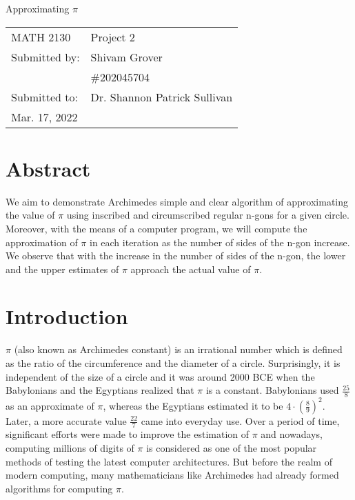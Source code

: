 \documentclass[12pt]{article}
\begin{document}
\begin{titlepage}
\begin{center}
\large Approximating $\displaystyle \pi$
\end{center}
\vspace{6cm}
\hfill\begin{tabular}{ll}
MATH 2130 & Project 2 \\
Submitted by: & Shivam Grover \\
& \#202045704 \\
Submitted to: & Dr. Shannon Patrick Sullivan \\
Mar. 17, 2022

\end{tabular}
\end{titlepage}

\section*{Abstract}
We aim to demonstrate Archimedes simple and clear algorithm of approximating the value of $\pi$ using inscribed and circumscribed regular n-gons for a given circle. Moreover, with the means of a computer program, we will compute the approximation of $\pi$ in each iteration as the number of sides of the n-gon increase.
We observe that with the increase in the number of sides of the n-gon, the lower and the upper estimates of $\pi$ approach the actual value of $\pi$.\\

\section {Introduction}
$\pi$ (also known as Archimedes constant) is an irrational number which is defined as the ratio of the circumference and the diameter of a circle. Surprisingly, it is independent of the size of a circle and it was around 2000 BCE when the Babylonians and the Egyptians realized that $\pi$ is a constant. Babylonians used $\frac{25}{8}$ as an approximate of $\pi$, whereas the Egyptians estimated it to be $4\cdot(\frac{8}{9})^2$. Later, a more accurate value $\frac{22}{7}$ came into everyday use. Over a period of time, significant efforts were made to improve the estimation of $\pi$ and nowadays, computing millions of digits of $\pi$  is considered as one of the most popular methods of testing the latest computer architectures. But before the realm of modern computing, many mathematicians like Archimedes had already formed algorithms for computing $\pi$.
\end{document}

